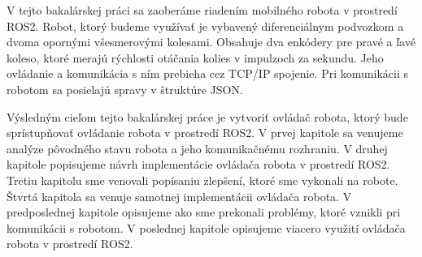V tejto bakalárskej práci sa zaoberáme riadením mobilného robota v prostredí ROS2. Robot, ktorý budeme využívať
je vybavený diferenciálnym podvozkom a dvoma opornými všesmerovými kolesami. Obsahuje dva enkódery pre pravé
a ľavé koleso, ktoré merajú rýchlosti otáčania kolies v impulzoch za sekundu. Jeho ovládanie a komunikácia
s ním prebieha cez TCP/IP spojenie. Pri komunikácii s robotom sa posielajú spravy v štruktúre JSON.

Výsledným cieľom tejto bakalárskej práce je vytvoriť ovládač robota, ktorý bude sprístupňovať ovládanie robota
v prostredí ROS2. V prvej kapitole sa venujeme analýze pôvodného stavu robota a jeho komunikačnému rozhraniu.
V druhej kapitole popisujeme návrh implementácie ovládača robota v prostredí ROS2. Tretiu kapitolu sme venovali
popísaniu zlepšení, ktoré sme vykonali na robote. Štvrtá kapitola sa venuje samotnej implementácii ovládača robota.
V predposlednej kapitole opisujeme ako sme prekonali problémy, ktoré vznikli pri komunikácii s robotom. V poslednej
kapitole opisujeme viacero využití ovládača robota v prostredí ROS2.
